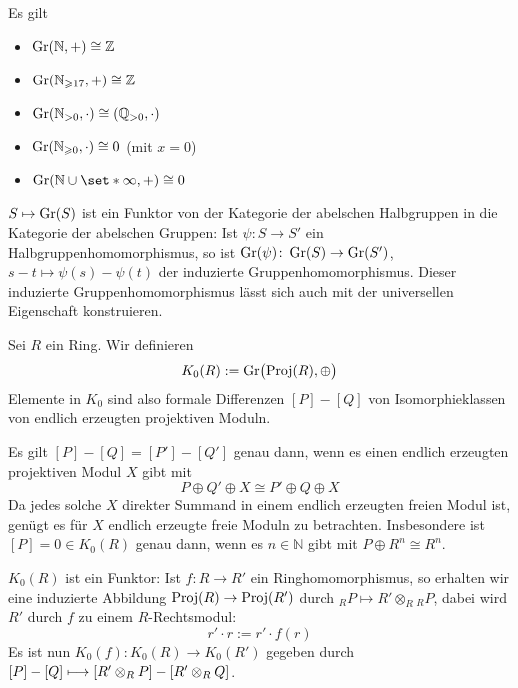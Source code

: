 \begin{beispiel}[{name=[{für Grothendiek-Konstruktionen}]}]
	Es gilt
	\begin{multicols}{2}
		\begin{itemize}
			\item $\Gr(\mathbb{N},+) \cong \mathbb{Z}$
			\item $\Gr(\mathbb{N}_{\ge 17},+) \cong \mathbb{Z}$
			\item $\Gr(\mathbb{N}_{>0},\cdot ) \cong (\mathbb{Q}_{>0},\cdot )$
			\item $\Gr(\mathbb{N}_{\ge 0},\cdot) \cong 0$ (mit $x=0$)
			\item $\Gr(\mathbb{N} \cup \set*{\infty},+) \cong 0$
		\end{itemize}
	\end{multicols}
\end{beispiel}

\begin{bemerkung}[{name=[{Funktorialität}]}]
	$S \mapsto \Gr(S)$ ist ein Funktor von der Kategorie der abelschen Halbgruppen in die Kategorie der abelschen Gruppen:
	Ist $\psi \colon S \to S'$ ein Halbgruppenhomomorphismus, so ist $\Gr(\psi) \colon \Gr(S) \to \Gr(S')$, $s-t \mapsto \psi(s) - \psi(t)$ der induzierte Gruppenhomomorphismus.
  Dieser induzierte Gruppenhomomorphismus lässt sich auch mit der universellen Eigenschaft konstruieren.
\end{bemerkung}

\begin{definition}[{name=[{$K_0$ von Ringen}]},label=def:K0_ring]
	Sei $R$ ein Ring. 
	Wir definieren
	\[
		K_0(R) := \Gr \enbrace[\big]{\Proj(R),\oplus }
	\]
	Elemente in $K_0$ sind also formale Differenzen $[P]- [Q]$ von Isomorphieklassen von endlich erzeugten projektiven Moduln.
\end{definition}

Es gilt $[P] - [Q] = [P']- [Q']$ genau dann, wenn es einen endlich erzeugten projektiven Modul $X$ gibt mit
\[
	P \oplus Q' \oplus X \cong P' \oplus Q \oplus X
\]
Da jedes solche $X$ direkter Summand in einem endlich erzeugten freien Modul ist, genügt es für $X$ endlich erzeugte freie Moduln zu betrachten.
Insbesondere ist $[P]=0 \in K_0(R)$ genau dann, wenn es $n \in \mathbb{N}$ gibt mit $P \oplus R^n \cong R^n$.

\begin{bemerkung}[{name=[{Funktoreigenschaften der 0-ten K-Theorie}]}]
	$K_0(R)$ ist ein Funktor: Ist $f \colon R \to R'$ ein Ringhomomorphismus, so erhalten wir eine induzierte Abbildung $\Proj(R) \to \Proj(R')$ durch $_R P \mapsto  R' \otimes_R {_R P}$, dabei wird $R'$ durch $f$ zu einem $R$-Rechtsmodul:
	\[
		r' \cdot r := r' \cdot f(r)
	\]
	Es ist nun $K_0(f) \colon K_0(R) \to K_0(R')$ gegeben durch 
	\(
		[P]- [Q] \longmapsto \benbrace*{R' \otimes_R P} - \benbrace*{R' \otimes_R Q}
	\).
\end{bemerkung}

